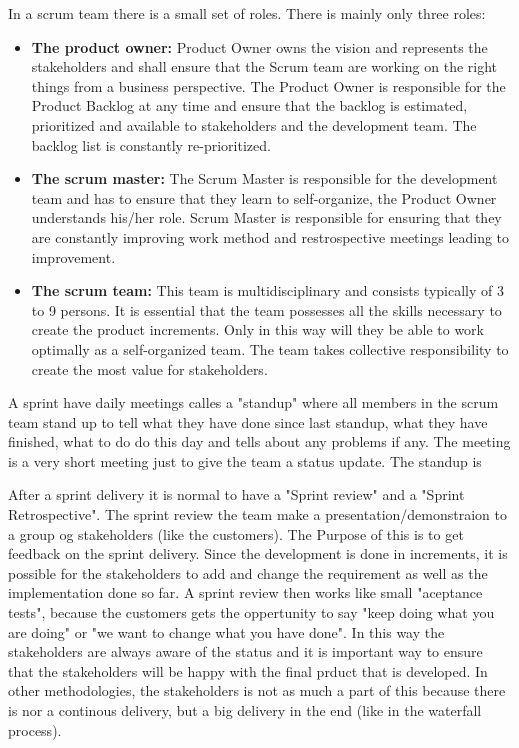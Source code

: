 In a scrum team there is a small set of roles. There is mainly only three roles: 
\begin{itemize}
    \item {\bf The product owner: }Product Owner owns the vision and represents the stakeholders
    and shall ensure that the Scrum team are working on the right things from a 
    business perspective. The Product Owner is responsible for the Product Backlog 
    at any time and ensure that the backlog is estimated, prioritized and available to 
    stakeholders and the development team. The backlog list is constantly re-prioritized. 
    \item {\bf The scrum master: }The Scrum Master is responsible for the development team and has 
    to ensure that they learn to self-organize, the Product Owner understands his/her role.
    Scrum Master is responsible for ensuring that they are constantly improving work method 
    and restrospective meetings leading to improvement.
    \item {\bf The scrum team: }This team is multidisciplinary and consists typically of 3 to 9 persons.
    It is essential that the team possesses all the skills necessary to create the product increments. 
    Only in this way will they be able to work optimally as a self-organized team. The team takes 
    collective responsibility to create the most value for stakeholders.
\end{itemize}

A sprint have daily meetings calles a "standup" where all members in the scrum team stand up
to tell what they have done since last standup, what they have finished, what to do do this day and
tells about any problems if any. The meeting is a very short meeting just to give the team a status
update. The standup is 

After a sprint delivery it is normal to have a "Sprint review" and a "Sprint Retrospective".
The sprint review the team make a presentation/demonstraion to a group og stakeholders (like the
customers). The Purpose of this is to get feedback on the sprint delivery. Since the development
is done in increments, it is possible for the stakeholders to add and change the requirement as
well as the implementation done so far. A sprint review then works like small "aceptance tests", 
because the customers gets the oppertunity to say "keep doing what you are doing" or "we want to change
what you have done". In this way the stakeholders are always aware of the status and it is important
way to ensure that the stakeholders will be happy with the final prduct that is developed. 
In other methodologies, the stakeholders is not as much a part of this because there is nor a 
continous delivery, but a big delivery in the end (like in the waterfall process).

